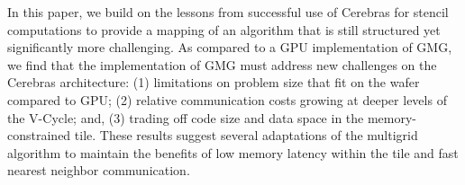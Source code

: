 \documentclass[sigconf]{acmart}
\begin{document}
In this paper, we build on the lessons from successful use of Cerebras for stencil computations to provide a mapping of an algorithm that is
still structured yet significantly more challenging. %
As compared to a GPU implementation of GMG, we find that the implementation of GMG must address new challenges on the Cerebras architecture: (1) limitations on problem size that fit on the wafer compared to GPU; (2) relative communication costs growing at deeper levels of the V-Cycle; and, (3) trading off code size and data space in the memory-constrained tile. 
These results suggest several adaptations of the multigrid algorithm to maintain the benefits of low memory latency within the tile and fast nearest neighbor communication.  %
\end{document}
